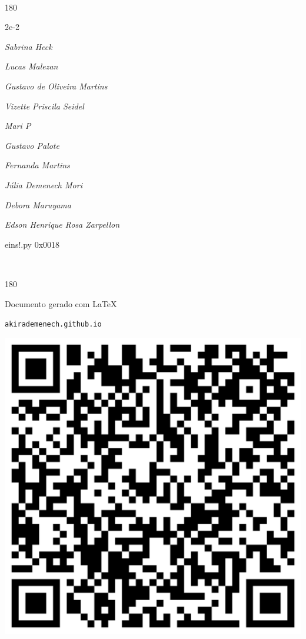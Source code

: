 \documentclass[12pt]{article}
\begin{document}
\pagebreak			

	\ 
	\vfill
	\begin{turn}{180}	
		\begin{minipage}{\textwidth}
		  	\ttfamily %
			\centering
			{\Huge 2e-2}
		  
			\hfill
		  
			

\textit{\small Sabrina Heck}

\textit{\small Lucas Malezan}

\textit{\small Gustavo de Oliveira Martins}

\textit{\small Vizette Priscila Seidel}

\textit{\small Mari P}

\textit{\small Gustavo Palote}

\textit{\small Fernanda Martins}

\textit{\small Júlia Demenech Mori}

\textit{\small Debora Maruyama}

\textit{\small Edson Henrique Rosa Zarpellon}

\bigskip

eins!.py
0x0018


		\end{minipage}	
	\end{turn}
	\vfill
	\

\pagebreak

	\begin{turn}{180}	
		\begin{minipage}{\textwidth}		  
		  Documento gerado com \LaTeX			
		  
		  \texttt{akirademenech.github.io}

		  \includegraphics[height=0.3\textheight]{2e-2.pdf}

		\end{minipage}	
	\end{turn}  
		  
\end{document}
